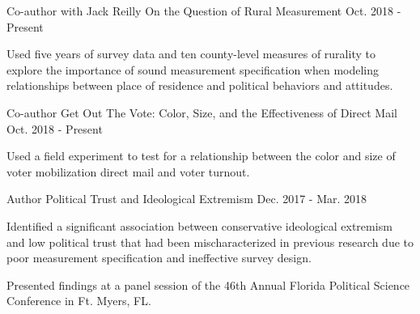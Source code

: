 \begin{cventries}
    \cventry
      {Co-author with Jack Reilly} %
      {On the Question of Rural Measurement} %
      {Oct. 2018 - Present} %
      {} %
      {
        \begin{cvitems} %
          \item {Used five years of survey data and ten county-level measures of rurality to explore the importance of sound measurement specification when modeling relationships between place of residence and political behaviors and attitudes.}
        \end{cvitems}
      }

    \cventry
      {Co-author} %
      {Get Out The Vote: Color, Size, and the Effectiveness of Direct Mail} %
      {Oct. 2018 - Present} %
      {} %
      {
        \begin{cvitems} %
          \item {Used a field experiment to test for a relationship between the color and size of voter mobilization direct mail and voter turnout.}
        \end{cvitems}
      }


    \cventry
      {Author} %
      {Political Trust and Ideological Extremism} %
      {Dec. 2017 - Mar. 2018} %
      {} %
      {
        \begin{cvitems} %
          \item {Identified a significant association between conservative ideological extremism and low political trust that had been mischaracterized in previous research due to poor measurement specification and ineffective survey design.}
          \item {Presented findings at a panel session of the 46th Annual Florida Political Science Conference in Ft. Myers, FL.}
        \end{cvitems}
      }

\end{cventries}
